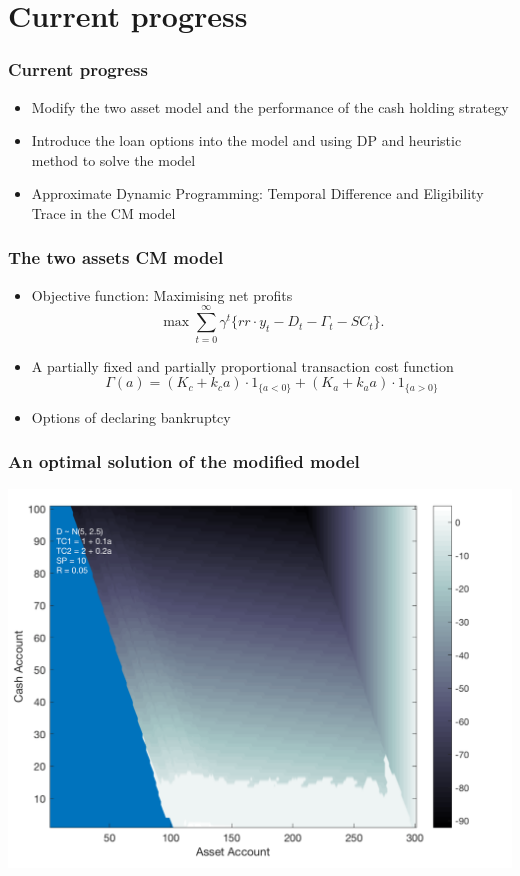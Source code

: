 \documentclass{beamer}
\begin{document}
\section{Current progress}
\begin{frame}
\frametitle{Current progress}
\begin{itemize}
\item Modify the two asset model and the performance of the cash holding strategy
\item Introduce the loan options into the model and using DP and heuristic method to solve the model
\item Approximate Dynamic Programming: Temporal Difference and Eligibility Trace in the CM model
\end{itemize}
\end{frame}

\begin{frame}
\frametitle{The two assets CM model}
\begin{itemize}
\item Objective function: Maximising net profits $$\max \sum^\infty _{t = 0}\gamma^t  \{ rr \cdot y_t - D_t - \Gamma_t - SC_t \}.$$
\item A partially fixed and partially proportional transaction cost function$$\Gamma(a) =  (K_c + k_c a) \cdot 1_{\{ a < 0\}} + (K_a +k_aa)\cdot 1_{\{a>0\}}$$
\item Options of declaring bankruptcy

\end{itemize}
\end{frame}



\begin{frame}
\frametitle{An optimal solution of the modified model}
\includegraphics[scale = 0.25]{ModifiedModel.png}
\end{frame}
\end{document}
